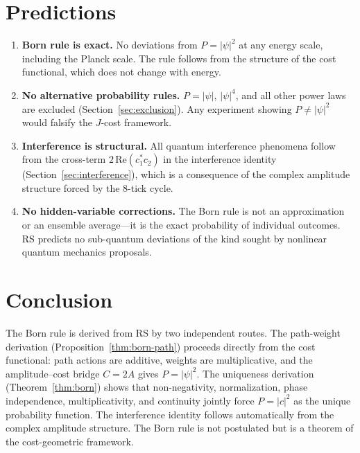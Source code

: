 \documentclass[12pt,a4paper]{article}
\theoremstyle{definition}
\theoremstyle{remark}
\begin{document}
\section{Predictions}
\label{sec:predictions}

\begin{enumerate}
  \item \textbf{Born rule is exact.}  No deviations from
  $P = |\psi|^2$ at any energy scale, including the Planck
  scale.  The rule follows from the structure of the cost
  functional, which does not change with energy.

  \item \textbf{No alternative probability rules.}
  $P = |\psi|$, $|\psi|^4$, and all other power laws are
  excluded (Section~\ref{sec:exclusion}).  Any experiment
  showing $P \neq |\psi|^2$ would falsify the $J$-cost
  framework.

  \item \textbf{Interference is structural.}  All quantum
  interference phenomena follow from the cross-term
  $2\,\mathrm{Re}(c_1^* c_2)$ in the interference identity
  (Section~\ref{sec:interference}), which is a consequence
  of the complex amplitude structure forced by the 8-tick
  cycle.

  \item \textbf{No hidden-variable corrections.}
  The Born rule is not an approximation or an ensemble
  average---it is the exact probability of individual
  outcomes.  RS predicts no sub-quantum deviations of the
  kind sought by nonlinear quantum mechanics proposals.
\end{enumerate}

\section{Conclusion}
\label{sec:conclusion}

The Born rule is derived from RS by two independent routes.
The path-weight derivation (Proposition~\ref{thm:born-path})
proceeds directly from the cost functional: path actions are
additive, weights are multiplicative, and the amplitude--cost
bridge $C = 2A$ gives $P = |\psi|^2$.  The uniqueness derivation (Theorem~\ref{thm:born}) shows that
non-negativity, normalization, phase independence,
multiplicativity, and continuity jointly force $P = |c|^2$ as
the unique probability function.  The
interference identity follows automatically from the complex
amplitude structure.  The Born rule is not postulated but is a
theorem of the cost-geometric framework.
\end{document}

